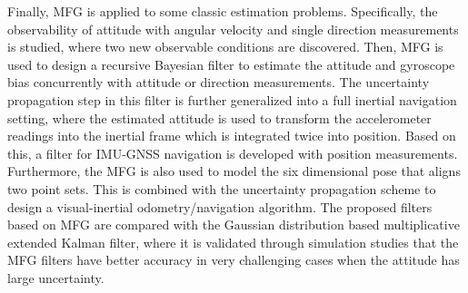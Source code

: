 {Finally, MFG is applied to some classic estimation problems.
Specifically, the observability of attitude with angular velocity and single direction measurements is studied, where two new observable conditions are discovered.
Then, MFG is used to design a recursive Bayesian filter to estimate the attitude and gyroscope bias concurrently with attitude or direction measurements.
The uncertainty propagation step in this filter is further generalized into a full inertial navigation setting, where the estimated attitude is used to transform the accelerometer readings into the inertial frame which is integrated twice into position.
Based on this, a filter for IMU-GNSS navigation is developed with position measurements.
Furthermore, the MFG is also used to model the six dimensional pose that aligns two point sets.
This is combined with the uncertainty propagation scheme to design a visual-inertial odometry/navigation algorithm.
The proposed filters based on MFG are compared with the Gaussian distribution based multiplicative extended Kalman filter, where it is validated through simulation studies that the MFG filters have better accuracy in very challenging cases when the attitude has large uncertainty.
}

